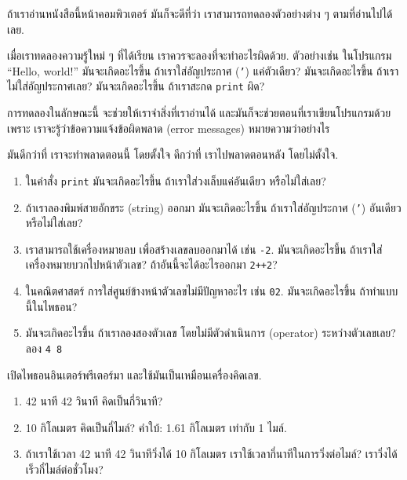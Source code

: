 \begin{exercise}

ถ้าเราอ่านหนังสือนี้หน้าคอมพิวเตอร์ มันก็จะดีที่ว่า เราสามารถทดลองตัวอย่างต่าง ๆ ตามที่อ่านไปได้เลย.

เมื่อเราทดลองความรู้ใหม่ ๆ ที่ได้เรียน เราควรจะลองที่จะทำอะไรผิดด้วย.
ตัวอย่างเช่น ในโปรแกรม ``Hello, world!'' 
มันจะเกิดอะไรขึ้น ถ้าเราใส่อัญประกาศ (\texttt{'}) แค่ตัวเดียว?
มันจะเกิดอะไรขึ้น ถ้าเราไม่ใส่อัญประกาศเลย?
มันจะเกิดอะไรขึ้น ถ้าเราสะกด \texttt{print} ผิด?

การทดลองในลักษณะนี้ จะช่วยให้เราจำสิ่งที่เราอ่านได้
และมันก็จะช่วยตอนที่เราเขียนโปรแกรมด้วย
เพราะ เราจะรู้ว่าข้อความแจ้งข้อผิดพลาด (error messages) หมายความว่าอย่างไร

มันดีกว่าที่ เราจะทำพลาดตอนนี้ โดยตั้งใจ
ดีกว่าที่ เราไปพลาดตอนหลัง โดยไม่ตั้งใจ.

\begin{enumerate}

\item ในคำสั่ง \texttt{print} 
มันจะเกิดอะไรขึ้น ถ้าเราใส่วงเล็บแค่อันเดียว หรือไม่ใส่เลย?

\item ถ้าเราลองพิมพ์สายอักขระ (string) ออกมา
มันจะเกิดอะไรขึ้น ถ้าเราใส่อัญประกาศ (\texttt{'}) อันเดียว
หรือไม่ใส่เลย?

\item เราสามารถใช้เครื่องหมายลบ เพื่อสร้างเลขลบออกมาได้ เช่น
\texttt{-2}.  
มันจะเกิดอะไรขึ้น ถ้าเราใส่เครื่องหมายบวกไปหน้าตัวเลข?
ถ้าอันนี้จะได้อะไรออกมา \texttt{2++2}?

\item ในคณิตศาสตร์ การใส่ศูนย์ข้างหน้าตัวเลขไม่มีปัญหาอะไร เช่น \texttt{02}.
มันจะเกิดอะไรขึ้น ถ้าทำแบบนี้ในไพธอน?

\item มันจะเกิดอะไรขึ้น ถ้าเราลองสองตัวเลข โดยไม่มีตัวดำเนินการ (operator) ระหว่างตัวเลขเลย? 
ลอง \texttt{4 8}

\end{enumerate}

\end{exercise}



\begin{exercise}

เปิดไพธอนอินเตอร์พรีเตอร์มา และใช้มันเป็นเหมือนเครื่องคิดเลข.

\begin{enumerate}

\item 42 นาที 42 วินาที คิดเป็นกี่วินาที?

\item 10 กิโลเมตร คิดเป็นกี่ไมล์?
คำใบ้: 1.61 กิโลเมตร เท่ากับ 1 ไมล์.

\item ถ้าเราใช้เวลา 42 นาที 42 วินาทีวิ่งได้ 10 กิโลเมตร
เราใช้เวลากี่นาทีในการวิ่งต่อไมล์?
เราวิ่งได้เร็วกี่ไมล์ต่อชั่วโมง?


\end{enumerate}

\end{exercise}




